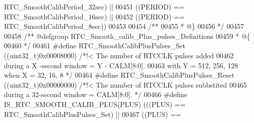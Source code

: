 \begin{DoxyCode}
      RTC_SmoothCalibPeriod_32sec\textcolor{preprocessor}{)} \textcolor{preprocessor}{||}
00451                                              \textcolor{preprocessor}{(}\textcolor{preprocessor}{(}\textcolor{preprocessor}{PERIOD}\textcolor{preprocessor}{)} \textcolor{preprocessor}{==} 
      RTC_SmoothCalibPeriod_16sec\textcolor{preprocessor}{)} \textcolor{preprocessor}{||}
00452                                              \textcolor{preprocessor}{(}\textcolor{preprocessor}{(}\textcolor{preprocessor}{PERIOD}\textcolor{preprocessor}{)} \textcolor{preprocessor}{==} 
      RTC_SmoothCalibPeriod_8sec\textcolor{preprocessor}{)}\textcolor{preprocessor}{)}
00453 
00454 \textcolor{comment}{/**}
00455 \textcolor{comment}{  * @\}}
00456 \textcolor{comment}{  */}
00457 
00458 \textcolor{comment}{/** @defgroup RTC\_Smooth\_calib\_Plus\_pulses\_Definitions }
00459 \textcolor{comment}{  * @\{}
00460 \textcolor{comment}{  */}
00461 \textcolor{preprocessor}{#}\textcolor{preprocessor}{define} \textcolor{preprocessor}{RTC\_SmoothCalibPlusPulses\_Set}    \textcolor{preprocessor}{(}\textcolor{preprocessor}{(}\textcolor{preprocessor}{uint32\_t}\textcolor{preprocessor}{)}0x00008000\textcolor{preprocessor}{)} \textcolor{comment}{/*!<  The number of RTCCLK pulses
       added  }
00462 \textcolor{comment}{                                                                during a X -second window = Y -
       CALM[8:0]. }
00463 \textcolor{comment}{                                                                 with Y = 512, 256, 128 when X = 32,
       16, 8 */}
00464 \textcolor{preprocessor}{#}\textcolor{preprocessor}{define} \textcolor{preprocessor}{RTC\_SmoothCalibPlusPulses\_Reset}  \textcolor{preprocessor}{(}\textcolor{preprocessor}{(}\textcolor{preprocessor}{uint32\_t}\textcolor{preprocessor}{)}0x00000000\textcolor{preprocessor}{)} \textcolor{comment}{/*!<  The number of RTCCLK pulses
       subbstited}
00465 \textcolor{comment}{                                                                 during a 32-second window =  
       CALM[8:0]. */}
00466 \textcolor{preprocessor}{#}\textcolor{preprocessor}{define} \textcolor{preprocessor}{IS\_RTC\_SMOOTH\_CALIB\_PLUS}\textcolor{preprocessor}{(}\textcolor{preprocessor}{PLUS}\textcolor{preprocessor}{)} \textcolor{preprocessor}{(}\textcolor{preprocessor}{(}\textcolor{preprocessor}{(}\textcolor{preprocessor}{PLUS}\textcolor{preprocessor}{)} \textcolor{preprocessor}{==} 
      RTC_SmoothCalibPlusPulses_Set\textcolor{preprocessor}{)} \textcolor{preprocessor}{||}
00467                                          \textcolor{preprocessor}{(}\textcolor{preprocessor}{(}\textcolor{preprocessor}{PLUS}\textcolor{preprocessor}{)} \textcolor{preprocessor}{==} 

\end{DoxyCode}
